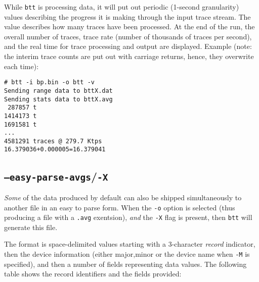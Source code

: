 \documentclass{article}
\begin{document}
  While \texttt{btt} is processing data, it will put out periodic (1-second
  granularity) values describing the progress it is making through the
  input trace stream. The value describes how many traces have been
  processed. At the end of the run, the overall number of traces, trace
  rate (number of thousands of traces per second), and the real time for
  trace processing and output are displayed. Example (note: the interim
  trace counts are put out with carriage returns, hence, they overwrite
  each time):

\begin{verbatim}
# btt -i bp.bin -o btt -v
Sending range data to bttX.dat
Sending stats data to bttX.avg
 287857 t
1414173 t
1691581 t
...
4581291 traces @ 279.7 Ktps
16.379036+0.000005=16.379041
\end{verbatim}

\subsection{\label{sec:o-X}\texttt{--easy-parse-avgs}/\texttt{-X}}

  \emph{Some} of the data produced by default can also be shipped
  simultaneously to another file in an easy to parse form. When
  the \texttt{-o} option is selected (thus producing a file with a
  \texttt{.avg} exentsion), \emph{and} the \texttt{-X} flag is present,
  then \texttt{btt} will generate this file.

  The format is space-delimited values starting with a 3-character
  \emph{record} indicator, then the device information (either major,minor
  or the device name when \texttt{-M} is specified), and then a number of
  fields representing data values. The following table shows the record
  identifiers and the fields provided:
\end{document}
